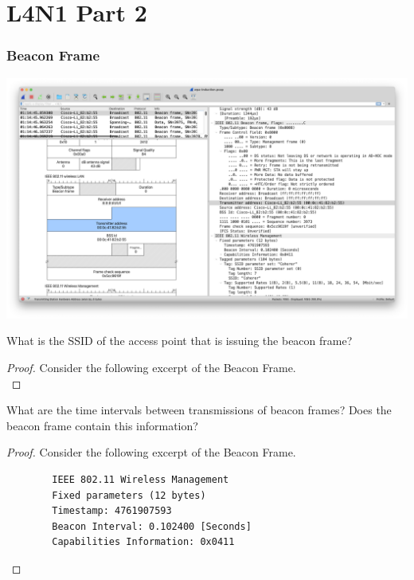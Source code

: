 \documentclass[../main.tex]{subfiles}
\begin{document}
\providecommand{\cisco}{\lstinline{Cisco-Li 82:b2:55 (00:0c:41:82:b2:55)}}
\providecommand{\apple}{\lstinline{Apple-82:36:3a}}
\section*{L4N1 Part 2}
\subsubsection*{Beacon Frame}
\includegraphics[width=\textwidth]{subfiles/images/PART2_Beacon_Frame.png}
\newpage

\begin{wts}
    What is the SSID of the access point that is issuing the beacon frame?
\end{wts}
\begin{proof}
Consider the following excerpt of the Beacon Frame.\\
\end{proof}
\newpage

\begin{wts}
    What are the time intervals between transmissions of beacon frames? Does the beacon frame contain this information?
\end{wts}
\begin{proof}
Consider the following excerpt of the Beacon Frame.
    \begin{lstlisting}
        IEEE 802.11 Wireless Management
        Fixed parameters (12 bytes)
        Timestamp: 4761907593
        Beacon Interval: 0.102400 [Seconds]
        Capabilities Information: 0x0411
    \end{lstlisting}
\end{proof}
\newpage
\end{document}
